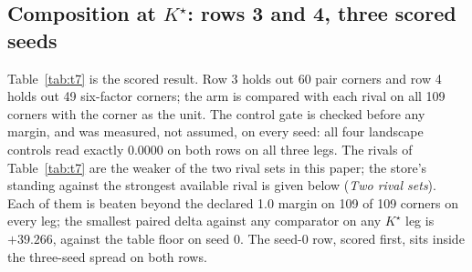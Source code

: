 \documentclass{article} %
\newcommand{\Kstar}{\ensuremath{K^{\star}}}
\begin{document}
\subsection{Composition at $\Kstar$: rows 3 and 4, three scored seeds}
\label{sec:shapes-t7}

Table~\ref{tab:t7} is the scored result. Row 3 holds out 60 pair corners and row 4 holds out
49 six-factor corners; the arm is compared with each rival on all 109 corners with the corner
as the unit. %
The control gate is checked before any margin, and was measured, not assumed, on every seed:
all four landscape controls read exactly 0.0000 on both rows on all three legs.
The rivals of Table~\ref{tab:t7} are the weaker of the two rival sets in this paper; the
store's standing against the strongest available rival is given below (\emph{Two rival sets}).
Each of them is beaten beyond the declared 1.0 margin on 109 of 109 corners on every leg; the
smallest paired delta against any comparator on any $\Kstar$ leg is $+39.266$, against the
table floor on seed 0. %
The seed-0 row, scored first, sits inside the three-seed spread on both rows.
\end{document}
